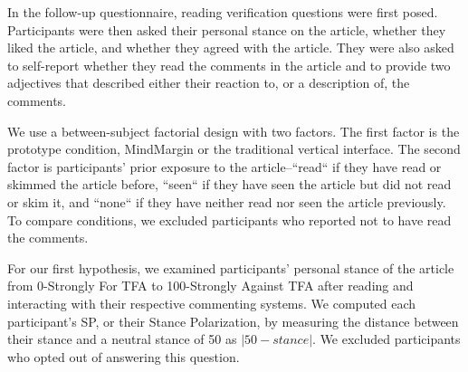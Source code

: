 In the follow-up questionnaire, reading verification questions were first posed. Participants were then asked their personal stance on the article, whether they liked the article, and whether they agreed with the article. They were also asked to self-report whether they read the comments in the article and to provide two adjectives that described either their reaction to, or a description of, the comments.

We use a between-subject factorial design with two factors. The first factor is the prototype condition, MindMargin or the traditional vertical interface. The second factor is participants' prior exposure to the article--``read`` if they have read or skimmed the article before, ``seen`` if they have seen the article but did not read or skim it, and ``none`` if they have neither read nor seen the article previously. To compare conditions, we excluded participants who reported not to have read the comments.

For our first hypothesis, we examined participants' personal stance of the article from 0-Strongly For TFA to 100-Strongly Against TFA after reading and interacting with their respective commenting systems. We computed each participant's SP, or their Stance Polarization, by measuring the distance between their stance and a neutral stance of 50 as $|50 - stance|$. We excluded participants who opted out of answering this question. 


